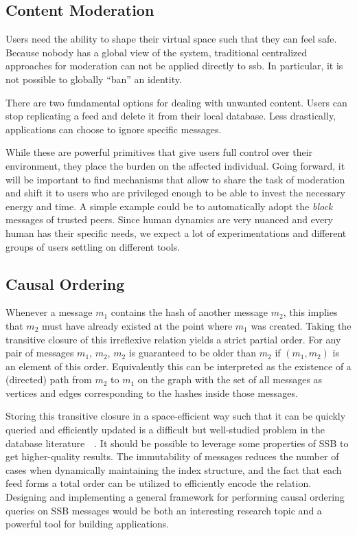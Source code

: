 \documentclass[10pt,sigconf,rewiew]{acmart}
\begin{document}
\subsection{Content Moderation}

Users need the ability to shape their virtual space such that they can feel safe. Because nobody has a global view of the system, traditional centralized approaches for moderation can not be applied directly to ssb. In particular, it is not possible to globally ``ban'' an identity.

There are two fundamental options for dealing with unwanted content. Users can stop replicating a feed and delete it from their local database. Less drastically, applications can choose to ignore specific messages.

While these are powerful primitives that give users full control over their environment, they place the burden on the affected individual. Going forward, it will be important to find mechanisms that allow to share the task of moderation and shift it to users who are privileged enough to be able to invest the necessary energy and time. A simple example could be to automatically adopt the \textit{block} messages of trusted peers. Since human dynamics are very nuanced and every human has their specific needs, we expect a lot of experimentations and different groups of users settling on different tools.

\subsection{Causal Ordering}


Whenever a message $m_1$ contains the hash of another message $m_2$, this implies that $m_2$ must have already existed at the point where $m_1$ was created. Taking the transitive closure of this irreflexive relation yields a strict partial order. For any pair of messages $m_1$, $m_2$, $m_2$ is guaranteed to be older than $m_2$ if $(m_1, m_2)$ is an element of this order. Equivalently this can be interpreted as the existence of a (directed) path from $m_2$ to $m_1$ on the graph with the set of all messages as vertices and edges corresponding to the hashes inside those messages.

Storing this transitive closure in a space-efficient way such that it can be quickly queried and efficiently updated is a difficult but well-studied problem in the database literature~\cite{jin2012scarab}~\cite{yildirim2013dagger}. It should be possible to leverage some properties of SSB to get higher-quality results. The immutability of messages reduces the number of cases when dynamically maintaining the index structure, and the fact that each feed forms a total order can be utilized to efficiently encode the relation. Designing and implementing a general framework for performing causal ordering queries on SSB messages would be both an interesting research topic and a powerful tool for building applications.
\end{document}
